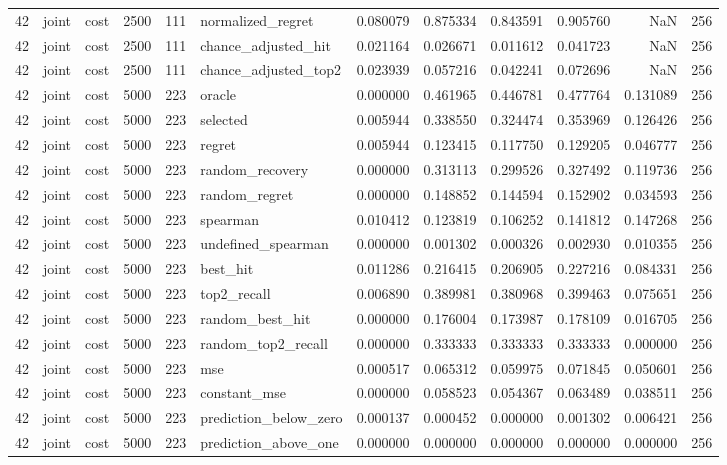 \begin{tabular}{rllrrlrrrrrr}
42 & joint & cost & 2500 & 111 & normalized_regret & 0.080079 & 0.875334 & 0.843591 & 0.905760 & NaN & 256 \\
42 & joint & cost & 2500 & 111 & chance_adjusted_hit & 0.021164 & 0.026671 & 0.011612 & 0.041723 & NaN & 256 \\
42 & joint & cost & 2500 & 111 & chance_adjusted_top2 & 0.023939 & 0.057216 & 0.042241 & 0.072696 & NaN & 256 \\
42 & joint & cost & 5000 & 223 & oracle & 0.000000 & 0.461965 & 0.446781 & 0.477764 & 0.131089 & 256 \\
42 & joint & cost & 5000 & 223 & selected & 0.005944 & 0.338550 & 0.324474 & 0.353969 & 0.126426 & 256 \\
42 & joint & cost & 5000 & 223 & regret & 0.005944 & 0.123415 & 0.117750 & 0.129205 & 0.046777 & 256 \\
42 & joint & cost & 5000 & 223 & random_recovery & 0.000000 & 0.313113 & 0.299526 & 0.327492 & 0.119736 & 256 \\
42 & joint & cost & 5000 & 223 & random_regret & 0.000000 & 0.148852 & 0.144594 & 0.152902 & 0.034593 & 256 \\
42 & joint & cost & 5000 & 223 & spearman & 0.010412 & 0.123819 & 0.106252 & 0.141812 & 0.147268 & 256 \\
42 & joint & cost & 5000 & 223 & undefined_spearman & 0.000000 & 0.001302 & 0.000326 & 0.002930 & 0.010355 & 256 \\
42 & joint & cost & 5000 & 223 & best_hit & 0.011286 & 0.216415 & 0.206905 & 0.227216 & 0.084331 & 256 \\
42 & joint & cost & 5000 & 223 & top2_recall & 0.006890 & 0.389981 & 0.380968 & 0.399463 & 0.075651 & 256 \\
42 & joint & cost & 5000 & 223 & random_best_hit & 0.000000 & 0.176004 & 0.173987 & 0.178109 & 0.016705 & 256 \\
42 & joint & cost & 5000 & 223 & random_top2_recall & 0.000000 & 0.333333 & 0.333333 & 0.333333 & 0.000000 & 256 \\
42 & joint & cost & 5000 & 223 & mse & 0.000517 & 0.065312 & 0.059975 & 0.071845 & 0.050601 & 256 \\
42 & joint & cost & 5000 & 223 & constant_mse & 0.000000 & 0.058523 & 0.054367 & 0.063489 & 0.038511 & 256 \\
42 & joint & cost & 5000 & 223 & prediction_below_zero & 0.000137 & 0.000452 & 0.000000 & 0.001302 & 0.006421 & 256 \\
42 & joint & cost & 5000 & 223 & prediction_above_one & 0.000000 & 0.000000 & 0.000000 & 0.000000 & 0.000000 & 256 \\

\end{tabular}
